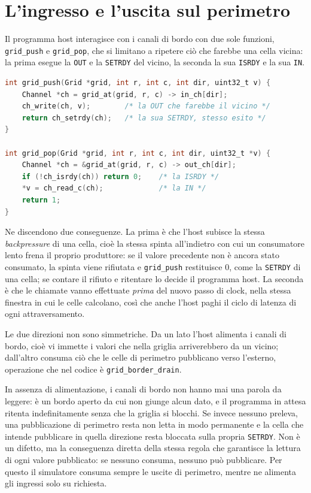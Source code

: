 \section{L'ingresso e l'uscita sul perimetro}
\label{sec:io-bordo}

Il programma host interagisce con i canali di bordo con due sole funzioni,
\texttt{grid\_push} e \texttt{grid\_pop}, che si limitano a ripetere ciò che
farebbe una cella vicina: la prima esegue la \texttt{OUT} e la \texttt{SETRDY}
del vicino, la seconda la sua \texttt{ISRDY} e la sua \texttt{IN}.

\begin{lstlisting}[caption={Le due funzioni con cui l'host si comporta da vicino},label={lst:pushpop},language=C,float=htbp]
int grid_push(Grid *grid, int r, int c, int dir, uint32_t v) {
    Channel *ch = grid_at(grid, r, c) -> in_ch[dir];
    ch_write(ch, v);        /* la OUT che farebbe il vicino */
    return ch_setrdy(ch);   /* la sua SETRDY, stesso esito */
}

int grid_pop(Grid *grid, int r, int c, int dir, uint32_t *v) {
    Channel *ch = &grid_at(grid, r, c) -> out_ch[dir];
    if (!ch_isrdy(ch)) return 0;    /* la ISRDY */
    *v = ch_read_c(ch);             /* la IN */
    return 1;
}
\end{lstlisting}

Ne discendono due conseguenze. La prima è che l'host subisce la stessa
\emph{backpressure} di una cella, cioè la stessa spinta all'indietro con cui un
consumatore lento frena il proprio produttore: se il valore precedente non è
ancora stato consumato, la spinta viene rifiutata e \texttt{grid\_push}
restituisce 0, come la \texttt{SETRDY} di una cella; se contare il rifiuto e
ritentare lo decide il programma host. La seconda è
che le chiamate vanno effettuate \emph{prima} del nuovo passo di clock, nella stessa
finestra in cui le celle calcolano, così che anche l'host paghi il ciclo di
latenza di ogni attraversamento.

Le due direzioni non sono simmetriche. Da un lato l'host alimenta i canali di
bordo, cioè vi immette i valori che nella griglia arriverebbero da un vicino;
dall'altro consuma ciò che le celle di perimetro pubblicano verso l'esterno,
operazione che nel codice è \texttt{grid\_border\_drain}.

In assenza di alimentazione, i canali di bordo non hanno mai una parola da
leggere: è un bordo aperto da cui non giunge alcun dato, e il programma in
attesa ritenta indefinitamente senza che la griglia si blocchi. Se invece
nessuno preleva, una pubblicazione di perimetro resta non letta in modo
permanente e la cella che intende pubblicare in quella direzione resta bloccata
sulla propria \texttt{SETRDY}. Non è un difetto, ma la conseguenza diretta della
stessa regola che garantisce la lettura di ogni valore pubblicato: se nessuno
consuma, nessuno può pubblicare. Per questo il simulatore consuma sempre le
uscite di perimetro, mentre ne alimenta gli ingressi solo su richiesta.

